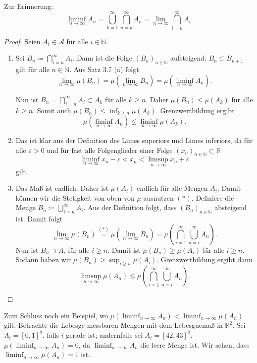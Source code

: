 \documentclass{article}
\newcommand{\R}{\mathbb{R}} %
\newcommand{\N}{\mathbb{N}} %
\begin{document}
Zur Erinnerung: 
$$\liminf_{n \to \infty} A_n = \bigcup_{k=1}^\infty \bigcap_{n = k}^\infty A_n = \lim_{n \to \infty} \bigcap_{i=n}^\infty A_i$$

\begin{proof}

Seien $A_i \in \mathcal A$ für alle $i \in \mathbb N$.

\begin{enumerate}[label=(\arabic*)]
    \item
    Sei $B_n \coloneqq \bigcap_{i = n}^\infty A_i$. Dann ist die Folge $(B_n)_{n \in \N}$ aufsteigend: $B_n \subset B_{n+1}$ gilt für alle $n \in \mathbb N$.
    Aus Satz 3.7 (a) folgt
    $$
        \lim_{n \to \infty} \mu(B_n) = \mu(\lim_{n \to \infty} B_n) = \mu(\liminf_{n \to \infty} A_n).
    $$
    
    Nun ist $B_n = \bigcap_{i = n}^\infty A_i \subset A_k$ für alle $k \geq n$. Daher $\mu(B_n) \leq \mu(A_k)$ für alle $k \geq n$. Somit auch $\mu(B_n) \leq \inf_{k \geq n}{\mu(A_k)}$. Grenzwertbildung ergibt
    $$
       \mu(\liminf_{n \to \infty} A_n) \le  \liminf_{n \to \infty} \mu(A_k).
    $$

    \item
    Das ist klar aus der Definition des Limes superiors und Limes inferiors, da für alle $\varepsilon > 0$ und für fast alle Folgenglieder einer Folge $(x_n)_{n \in \N} \subset \R$ 
    \begin{equation*}
        \liminf_{n \to \infty} x_n - \varepsilon
        < x_n
        < \limsup_{n \to \infty} x_n + \varepsilon
    \end{equation*}
    gilt.
    
    \item
    Das Maß ist endlich. Daher ist $\mu(A_i)$ endlich für alle Mengen $A_i$.
    Damit können wir die Stetigkeit von oben von $\mu$ ausnutzen $(*)$.
    Definiere die Menge $B_n \coloneqq \bigcup_{i=n}^\infty A_i$. Aus der Definition folgt, dass $(B_n)_{n \in \mathbb N}$ absteigend ist. Damit folgt
    $$
        \lim_{n \to \infty} \mu(B_n)
        \overset{(*)}{=} \mu (\lim_{n \to \infty} B_n)
        = \mu \left(\bigcap_{i=1}^\infty \bigcup_{n=i}^\infty A_n\right).
    $$
    Nun ist $B_n \supset A_i$ für alle $i \geq n$. Damit ist $\mu(B_n) \geq \mu(A_i)$ für alle $i \geq n$. Sodann haben wir $\mu(B_n) \geq \sup_{i \geq n}\mu(A_i)$. Grenzwertbildung ergibt dann
    $$
        \limsup_{n \to \infty} \mu(A_n)
        \leq \mu \left(\bigcap_{i=1}^\infty \bigcup_{n=i}^\infty A_n\right).
    $$
\end{enumerate}
\end{proof}

Zum Schluss noch ein Beispiel, wo $\mu (\liminf_{n \to \infty} A_n) < \liminf_{n \to \infty} \mu(A_n)$ gilt. Betrachte die Lebesge-messbaren Mengen mit dem Lebesguemaß in $\mathbb R^2$. Sei $A_i = [0,1]^2$, falls $i$ gerade ist; andernfalls sei $A_i = [42,43]^2$. $\mu (\liminf_{n \to \infty} A_n) = 0$, da $\liminf_{n \to \infty} A_n$ die leere Menge ist. Wir sehen, dass $\liminf_{n \to \infty} \mu(A_n) = 1$ ist.
\end{document}
